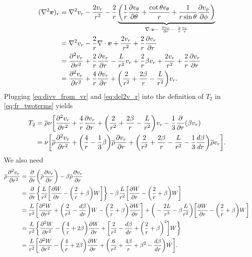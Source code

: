 \documentclass[12pt]{article} %
\newcommand{\pderiv}[2]{\frac{\partial#1}{\partial#2}}
\newcommand{\ppderiv}[2]{\frac{\partial^2#1}{\partial#2^2}}
\newcommand{\rhobar}{\overline{\rho}}
\newcommand{\Div}{\nabla\cdot}
\begin{document}
	\begin{align}
	(\nabla^2\bm{v})_r &= \nabla^2v_r - \frac{2v_r}{r^2}-\frac{2}{r}\underbrace{\bigg{(}\frac{1}{r}\pderiv{v_\theta}{\theta} + \frac{\cot\theta v_\theta}{r} + \frac{1}{r\sin\theta}\pderiv{v_\phi}{\phi}\bigg{)}}_{\nabla\cdot\bm{v} -\ \pderiv{v_r}{r} -\ \frac{2}{r}\frac{v_r}{r}}\nonumber\\
	&= \nabla^2v_r - \frac{2}{r}\Div\bm{v}+\frac{2v_r}{r^2} + \frac{2}{r}\pderiv{v_r}{r}\nonumber\\
	&= \frac{\partial^2v_r}{\partial r^2}+\frac{2}{r}\pderiv{v_r}{r} - \frac{L}{r^2}v_r + \frac{2}{r}\beta v_r + \frac{2v_r}{r^2} + \frac{2}{r}\pderiv{v_r}{r}\nonumber\\
	&= \frac{\partial^2v_r}{\partial r^2} + \frac{4}{r}\pderiv{v_r}{r} + \bigg{(}\frac{2}{r^2}+\frac{2\beta}{r}-\frac{L}{r^2}\bigg{)}v_r.
	\label{eq:del2v_r}
	\end{align}
	Plugging \eqref{eq:divv_from_vr} and \eqref{eq:del2v_r} into the definition of $T_2$ in \eqref{eq:fr_twoterms} yields
	\begin{align}
	T_2 &= \rhobar\nu\bigg{[}\frac{\partial^2v_r}{\partial r^2} + \frac{4}{r}\pderiv{v_r}{r} + \bigg{(}\frac{2}{r^2}+\frac{2\beta}{r}-\frac{L}{r^2}\bigg{)}v_r - \frac{1}{3}\pderiv{}{r}(\beta v_r)\nonumber\\
	&= \nu\bigg{[}\rhobar\ppderiv{v_r}{r} + \bigg{(}\frac{4}{r}-\frac{1}{3}\beta\bigg{)}\rhobar\pderiv{v_r}{r} + \bigg{(}\frac{2}{r^2}+\frac{2\beta}{r}-\frac{L}{r^2}-\frac{1}{3}\frac{d\beta}{dr}\bigg{)}\rhobar v_r\bigg{]}. 
	\label{eq:t2_from_rhodvr}
	\end{align}
	We also need
	\begin{align}
	\rhobar\ppderiv{v_r}{r} &= \pderiv{}{r}\bigg{(}\rhobar\pderiv{v_r}{r}\bigg{)}-\beta\rhobar\pderiv{v_r}{r}\nonumber\\
	&= \pderiv{}{r}\bigg{\{}\frac{L}{r^2}\bigg{[}\pderiv{W}{r}-\bigg{(}\frac{2}{r}+\beta\bigg{)}W\bigg{]}\bigg{\}} - \beta\frac{L}{r^2}\bigg{[}\pderiv{W}{r}-\bigg{(}\frac{2}{r}+\beta\bigg{)}W\bigg{]}\nonumber\\
	&= \frac{L}{r^2}\bigg{[}\ppderiv{W}{r}+\bigg{(}\frac{2}{r^2}-\frac{d\beta}{dr}\bigg{)}W-\bigg{(}\frac{2}{r}+\beta\bigg{)}\pderiv{W}{r}\bigg{]} + \bigg{(}-\frac{2L}{r^3}-\beta\frac{L}{r^2}\bigg{)}\bigg{[}\pderiv{W}{r}-\bigg{(}\frac{2}{r}+\beta\bigg{)}W\bigg{]}\nonumber\\
	&= \frac{L}{r^2}\bigg{\{}\ppderiv{W}{r}-\bigg{(}\frac{4}{r}+2\beta\bigg{)}\pderiv{W}{r}+\bigg{[}\frac{2}{r^2}-\frac{d\beta}{dr}+\bigg{(}\frac{2}{r}+\beta\bigg{)}^2\bigg{]}W\bigg{\}}\nonumber\\
	&= \frac{L}{r^2}\bigg{[}\ppderiv{W}{r}-\bigg{(}\frac{4}{r}+2\beta\bigg{)}\pderiv{W}{r}+\bigg{(}\frac{6}{r^2}+\frac{4\beta}{r}+\beta^2-\frac{d\beta}{dr}\bigg{)}W\bigg{]}.
	\label{eq:rhod2vr_from_W}
	\end{align}
\end{document}
